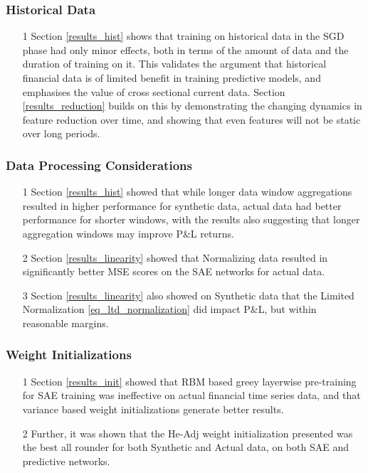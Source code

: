 \documentclass[a4paper,11pt,oneside]{article}
\theoremstyle{plain}
\theoremstyle{definition}
\begin{document}
\subsubsection{Historical Data}
\begin{itemize}
	\item[1] Section \ref{results_hist} shows that training on historical data in the SGD phase had only minor effects, both in terms of the amount of data and the duration of training on it. This validates the argument that historical financial data is of limited benefit in training predictive models, and emphasises the value of cross sectional current data. Section \ref{results_reduction} builds on this by demonstrating the changing dynamics in feature reduction over time, and showing that even features will not be static over long periods.
\end{itemize}

\subsubsection{Data Processing Considerations}
\begin{itemize}
	\item[1] Section \ref{results_hist} showed that while longer data window aggregations resulted in higher performance for synthetic  data, actual data had better performance for shorter windows, with the results also suggesting that longer aggregation windows may improve P\&L returns.
	\item[2] Section \ref{results_linearity} showed that Normalizing data resulted in significantly better MSE scores on the SAE networks for actual data. 
	\item[3] Section \ref{results_linearity} also showed on Synthetic data that the Limited Normalization \eqref{eq_ltd_normalization} did impact P\&L, but within reasonable margins.
\end{itemize}

\subsubsection{Weight Initializations}
\begin{itemize}
	\item[1] Section \ref{results_init} showed that RBM based greey layerwise pre-training for SAE training was ineffective on actual financial time series data, and that variance based weight initializations generate better results.
	\item[2] Further, it was shown that the He-Adj weight initialization presented was the best all rounder for both Synthetic and Actual data, on both SAE and predictive networks.
\end{itemize}
\end{document}
